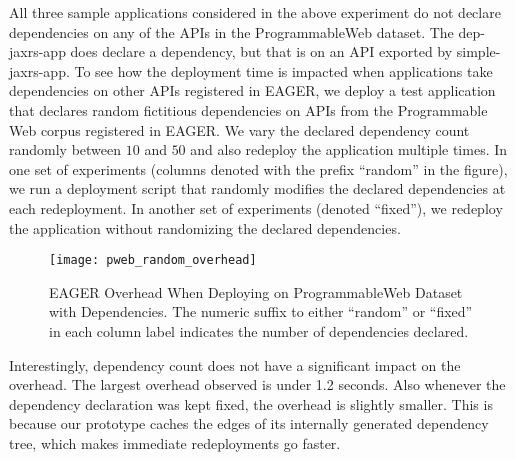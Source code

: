 All three sample applications considered in the above experiment do not declare dependencies on any of the APIs in the ProgrammableWeb
dataset. The dep-jaxrs-app does declare a dependency, but that is on an API exported by simple-jaxrs-app. To see how the deployment time is impacted
when applications take dependencies on other APIs registered in EAGER, we
deploy a test application that declares random fictitious dependencies on APIs
from the Programmable Web corpus registered in EAGER. 
We vary the declared dependency count randomly between $10$ and $50$ 
and also redeploy the application multiple times.
In one set of experiments (columns denoted with the prefix ``random'' in the
figure), we run a deployment script that randomly modifies the 
declared dependencies at each redeployment. In another set of 
experiments (denoted ``fixed''), we redeploy the application 
without randomizing the declared dependencies.

\begin{figure}
\centering
\texttt{[image: pweb\_random\_overhead]}
\vspace{-0.01in}
\caption{EAGER Overhead When Deploying on ProgrammableWeb Dataset with
Dependencies. The numeric suffix to either ``random'' or ``fixed'' in each
column
label indicates the number of dependencies declared.}
\label{fig:pweb_random_overhead}
\end{figure}


Interestingly, dependency count does not have a significant impact on 
the overhead. %
The largest overhead observed is under 1.2 seconds.
Also whenever the dependency declaration was kept fixed, the overhead is slightly smaller. This is because our prototype caches
the edges of its internally generated dependency tree, 
which makes immediate redeployments go faster.

